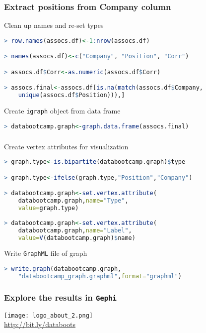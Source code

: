 \documentclass[xcolor=dvipsnames, 9pt]{beamer}
\begin{document}
\begin{frame}[fragile]
    \frametitle{Extract positions from Company column}
    \begin{block}{Clean up names and re-set types}
        \begin{lstlisting}[language=R]
> row.names(assocs.df)<-1:nrow(assocs.df)

> names(assocs.df)<-c("Company", "Position", "Corr")

> assocs.df$Corr<-as.numeric(assocs.df$Corr)

> assocs.final<-assocs.df[is.na(match(assocs.df$Company,
    unique(assocs.df$Position))),]
        \end{lstlisting}
    \end{block}
    
    \begin{block}{Create \texttt{igraph} object from data frame}
        \begin{lstlisting}[language=R]
> databootcamp.graph<-graph.data.frame(assocs.final)
        \end{lstlisting}
    \end{block}
    
\end{frame}

\begin{frame}[fragile]
    \frametitle{}
    \begin{block}{Create vertex attributes for visualization}
        \begin{lstlisting}[language=R]
> graph.type<-is.bipartite(databootcamp.graph)$type

> graph.type<-ifelse(graph.type,"Position","Company")

> databootcamp.graph<-set.vertex.attribute(
    databootcamp.graph,name="Type",
    value=graph.type)
    
> databootcamp.graph<-set.vertex.attribute(
    databootcamp.graph,name="Label",
    value=V(databootcamp.graph)$name)
        \end{lstlisting}
    \end{block}
    
    \begin{block}{Write \texttt{GraphML} file of graph}
        \begin{lstlisting}[language=R]
> write.graph(databootcamp.graph, 
    "databootcamp_graph.graphml",format="graphml")
        \end{lstlisting}
    \end{block}
\end{frame}

\begin{frame}[fragile]
    \frametitle{Explore the results in \texttt{Gephi}}
    \begin{center}
        \texttt{[image: logo\_about\_2.png]}\\
        \vspace{1cm}
        \LARGE{\url{http://bit.ly/databoots}}
    \end{center}
\end{frame}


\end{document}
